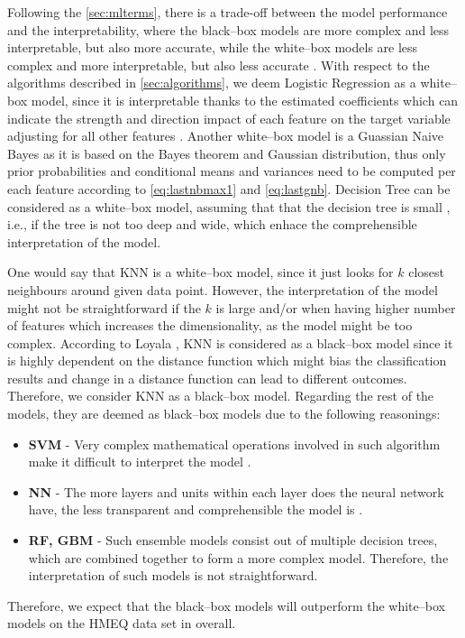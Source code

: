 Following the \autoref{sec:mlterms}, there is a trade-off between the model performance and the interpretability, where the black--box models are more complex and less interpretable, but also more accurate, while the white--box models are less complex and more interpretable, but also less accurate \citep{pintelas2020grey}.
With respect to the algorithms described in \autoref{sec:algorithms}, we deem Logistic Regression as a white--box model, since it is interpretable thanks to the estimated coefficients which can indicate the strength and direction impact of each feature on the target variable adjusting for all other features \citep{park2013introduction}.
Another white--box model is a Guassian Naive Bayes as it is based on the Bayes theorem and Gaussian distribution, thus only prior probabilities and conditional means and variances need to be computed per each feature according to \autoref{eq:lastnbmax1} and \autoref{eq:lastgnb}.
Decision Tree can be considered as a white--box model, assuming that that the decision tree is small \citep{goethals2022non}, i.e., if the tree is not too deep and wide, which enhace the comprehensible interpretation of the model.

One would say that KNN is a white--box model, since it just looks for $k$ closest neighbours around given data point. However, the interpretation of the model might not be straightforward if the $k$ is large and/or when having higher number of features which increases the dimensionality, as the model might be too complex.
According to Loyala \citep{loyola2019black}, KNN is considered as a black--box model since it is highly dependent on the distance function which might bias the classification results and change in a distance function can lead to different outcomes. Therefore, we consider KNN as a black--box model.
Regarding the rest of the models, they are deemed as black--box models due to the following reasonings:
\begin{itemize}\setlength\itemsep{0em}
    \item \textbf{SVM} - Very complex mathematical operations involved in such algorithm make it difficult to interpret the model \citep{loyola2019black}.
    \item \textbf{NN} - The more layers and units within each layer does the neural network have, the less transparent and comprehensible the model is \citep{bathaee2017artificial}.
    \item \textbf{RF, GBM} - Such ensemble models consist out of multiple decision trees, which are combined together to form a more complex model. Therefore, the interpretation of such models is not straightforward.
\end{itemize}
Therefore, we expect that the black--box models will outperform the white--box models on the HMEQ data set in overall.

